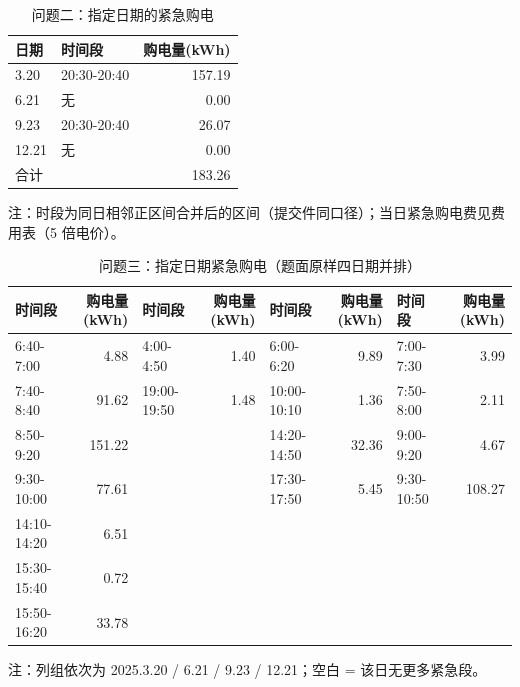 \begin{table}[htbp]
\centering
\caption{问题二：指定日期的紧急购电}
\label{tab:q2-c}
\small
\setlength{\tabcolsep}{4pt}
\begin{tabular}{llr}
\toprule
日期 & 时间段 & 购电量(kWh) \\
\midrule
3.20 & 20:30-20:40 & 157.19 \\
6.21 & 无 & 0.00 \\
9.23 & 20:30-20:40 & 26.07 \\
12.21 & 无 & 0.00 \\
合计 &  & 183.26 \\
\bottomrule
\end{tabular}
\vspace{2pt}
\begin{flushleft}\footnotesize 注：时段为同日相邻正区间合并后的区间（提交件同口径）；当日紧急购电费见费用表（5 倍电价）。\end{flushleft}
\end{table}
\begin{table}[htbp]
\centering
\caption{问题三：指定日期紧急购电（题面原样四日期并排）}
\label{tab:q3-c2}
\small
\setlength{\tabcolsep}{4pt}
\begin{tabular}{lrlrlrlr}
\toprule
时间段 & 购电量 (kWh) & 时间段 & 购电量 (kWh) & 时间段 & 购电量 (kWh) & 时间段 & 购电量 (kWh) \\
\midrule
6:40-7:00 & 4.88 & 4:00-4:50 & 1.40 & 6:00-6:20 & 9.89 & 7:00-7:30 & 3.99 \\
7:40-8:40 & 91.62 & 19:00-19:50 & 1.48 & 10:00-10:10 & 1.36 & 7:50-8:00 & 2.11 \\
8:50-9:20 & 151.22 &  &  & 14:20-14:50 & 32.36 & 9:00-9:20 & 4.67 \\
9:30-10:00 & 77.61 &  &  & 17:30-17:50 & 5.45 & 9:30-10:50 & 108.27 \\
14:10-14:20 & 6.51 &  &  &  &  &  &  \\
15:30-15:40 & 0.72 &  &  &  &  &  &  \\
15:50-16:20 & 33.78 &  &  &  &  &  &  \\
\bottomrule
\end{tabular}
\vspace{2pt}
\begin{flushleft}\footnotesize 注：列组依次为 2025.3.20 / 6.21 / 9.23 / 12.21；空白 = 该日无更多紧急段。\end{flushleft}
\end{table}
